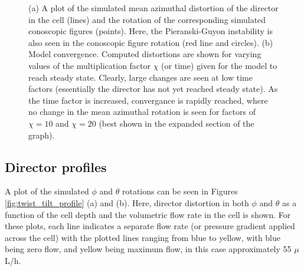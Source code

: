 \begin{figure}
\begin{center}
\end{center}
\caption[Simulated conoscopic figure rotation and convergance of model]{\label{fig:simulations} (a) A plot of the simulated mean azimuthal distortion of the director in the cell (lines) and the rotation of the corresponding simulated conoscopic figures (points). Here, the Pieranski-Guyon instability is also seen in the conoscopic figure rotation (red line and circles). (b) Model convergence. Computed distortions are shown for varying values of the multiplication factor $\chi$ (or time) given for the model to reach steady state. Clearly, large changes are seen at low time factors (essentially the director has not yet reached steady state). As the time factor is increased, convergance is rapidly reached, where no change in the mean azimuthal rotation is seen for factors of $\chi=10$ and $\chi=20$ (best shown in the expanded section of the graph).}
\end{figure}

\subsection{Director profiles}
A plot of the simulated $\phi$ and $\theta$ rotations can be seen in Figures \ref{fig:twist_tilt_profile} (a) and (b). Here, director distortion in both $\phi$ and $\theta$ as a function of the cell depth and the volumetric flow rate in the cell is shown. For these plots, each line indicates a separate flow rate (or pressure gradient applied across the cell) with the plotted lines ranging from blue to yellow, with blue being zero flow, and yellow being maximum flow, in this case approximately 55 $\mu$L/h.

